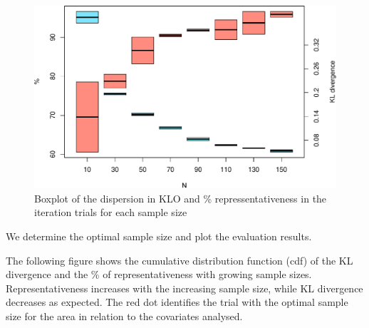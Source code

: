 \documentclass[
  10pt,
  b5paper,
  oneside]{book}
\begin{document}
\begin{figure}
\centering
\includegraphics{Technical-Manual-Soil-Sampling-Design_files/figure-latex/fig-7a-1.pdf}
\caption{\label{fig:fig-7a}Boxplot of the dispersion in KLO and \% repressentativeness in the iteration trials for each sample size}
\end{figure}

We determine the optimal sample size and plot the evaluation results.

The following figure shows the cumulative distribution function (cdf) of the KL divergence and the \% of representativeness with growing sample sizes. Representativeness increases with the increasing sample size, while KL divergence decreases as expected. The red dot identifies the trial with the optimal sample size for the area in relation to the covariates analysed.
\end{document}

